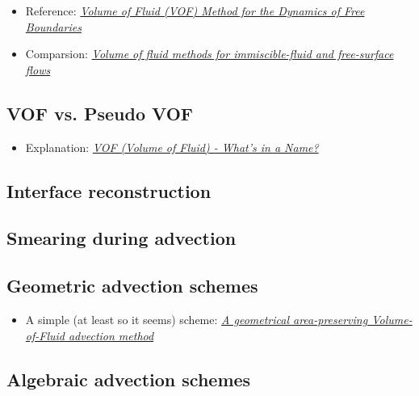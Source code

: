 \begin{itemize}
    \item Reference: \textit{\href{http://pages.csam.montclair.edu/~yecko/icodes/HirtNichols_Surfer_JCP1981.pdf}{Volume of Fluid (VOF) Method for the Dynamics of Free Boundaries}}
    \item Comparsion: \textit{\href{http://capfluidicslit.mme.pdx.edu/reference/Numerics/Gopala_ChemEngJ2008_VOFMethodsFreeSurfaceFlow.pdf}{Volume of fluid methods for immiscible-fluid and free-surface flows}}
\end{itemize}

\subsection{VOF vs. Pseudo VOF}

\begin{itemize}
    \item Explanation: \textit{\href{http://www.flow3d.com/cfd-101/cfd-101-VOF.html}{VOF (Volume of Fluid) - What's in a Name?}}
\end{itemize}

\subsection{Interface reconstruction}

\subsection{Smearing during advection}

\subsection{Geometric advection schemes}

\begin{itemize}
    \item A simple (at least so it seems) scheme: \textit{\href{http://www.lmm.jussieu.fr/~zaleski/nota02.pdf}{A geometrical area-preserving Volume-of-Fluid advection method}}
\end{itemize}

\subsection{Algebraic advection schemes}

